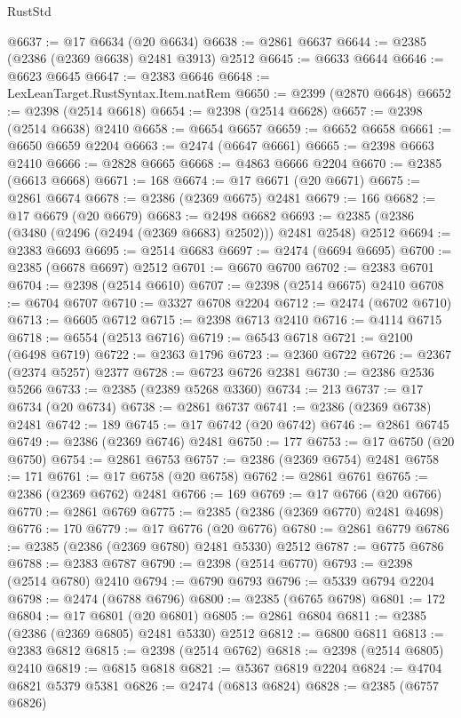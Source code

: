 \begin{lexlean}{RustStd}
\begin{coremodule}
@6637 := @17 @6634 (@20 @6634)
@6638 := @2861 @6637
@6644 := @2385 (@2386 (@2369 @6638) @2481 @3913) @2512
@6645 := @6633 @6644
@6646 := @6623 @6645
@6647 := @2383 @6646
@6648 := LexLeanTarget.RustSyntax.Item.natRem
@6650 := @2399 (@2870 @6648)
@6652 := @2398 (@2514 @6618)
@6654 := @2398 (@2514 @6628)
@6657 := @2398 (@2514 @6638) @2410
@6658 := @6654 @6657
@6659 := @6652 @6658
@6661 := @6650 @6659 @2204
@6663 := @2474 (@6647 @6661)
@6665 := @2398 @6663 @2410
@6666 := @2828 @6665
@6668 := @4863 @6666 @2204
@6670 := @2385 (@6613 @6668)
@6671 := 168
@6674 := @17 @6671 (@20 @6671)
@6675 := @2861 @6674
@6678 := @2386 (@2369 @6675) @2481
@6679 := 166
@6682 := @17 @6679 (@20 @6679)
@6683 := @2498 @6682
@6693 := @2385 (@2386 (@3480 (@2496 (@2494 (@2369 @6683) @2502))) @2481 @2548) @2512
@6694 := @2383 @6693
@6695 := @2514 @6683
@6697 := @2474 (@6694 @6695)
@6700 := @2385 (@6678 @6697) @2512
@6701 := @6670 @6700
@6702 := @2383 @6701
@6704 := @2398 (@2514 @6610)
@6707 := @2398 (@2514 @6675) @2410
@6708 := @6704 @6707
@6710 := @3327 @6708 @2204
@6712 := @2474 (@6702 @6710)
@6713 := @6605 @6712
@6715 := @2398 @6713 @2410
@6716 := @4114 @6715
@6718 := @6554 (@2513 @6716)
@6719 := @6543 @6718
@6721 := @2100 (@6498 @6719)
@6722 := @2363 @1796
@6723 := @2360 @6722
@6726 := @2367 (@2374 @5257) @2377
@6728 := @6723 @6726 @2381
@6730 := @2386 @2536 @5266
@6733 := @2385 (@2389 @5268 @3360)
@6734 := 213
@6737 := @17 @6734 (@20 @6734)
@6738 := @2861 @6737
@6741 := @2386 (@2369 @6738) @2481
@6742 := 189
@6745 := @17 @6742 (@20 @6742)
@6746 := @2861 @6745
@6749 := @2386 (@2369 @6746) @2481
@6750 := 177
@6753 := @17 @6750 (@20 @6750)
@6754 := @2861 @6753
@6757 := @2386 (@2369 @6754) @2481
@6758 := 171
@6761 := @17 @6758 (@20 @6758)
@6762 := @2861 @6761
@6765 := @2386 (@2369 @6762) @2481
@6766 := 169
@6769 := @17 @6766 (@20 @6766)
@6770 := @2861 @6769
@6775 := @2385 (@2386 (@2369 @6770) @2481 @4698)
@6776 := 170
@6779 := @17 @6776 (@20 @6776)
@6780 := @2861 @6779
@6786 := @2385 (@2386 (@2369 @6780) @2481 @5330) @2512
@6787 := @6775 @6786
@6788 := @2383 @6787
@6790 := @2398 (@2514 @6770)
@6793 := @2398 (@2514 @6780) @2410
@6794 := @6790 @6793
@6796 := @5339 @6794 @2204
@6798 := @2474 (@6788 @6796)
@6800 := @2385 (@6765 @6798)
@6801 := 172
@6804 := @17 @6801 (@20 @6801)
@6805 := @2861 @6804
@6811 := @2385 (@2386 (@2369 @6805) @2481 @5330) @2512
@6812 := @6800 @6811
@6813 := @2383 @6812
@6815 := @2398 (@2514 @6762)
@6818 := @2398 (@2514 @6805) @2410
@6819 := @6815 @6818
@6821 := @5367 @6819 @2204
@6824 := @4704 @6821 @5379 @5381
@6826 := @2474 (@6813 @6824)
@6828 := @2385 (@6757 @6826)

\end{coremodule}
\end{lexlean}
